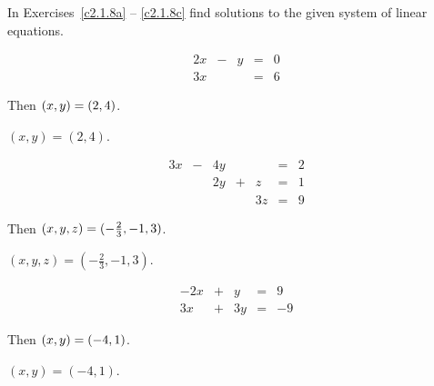 \documentclass{ximera}
\begin{document}
\noindent In Exercises~\ref{c2.1.8a} -- \ref{c2.1.8c} find solutions
to the given system of linear equations.
\begin{exercise} \label{c2.1.8a}
\[
\begin{array}{rcrcr}
 2x & - & y & = & 0 \\
 3x &   &   & = & 6 \end{array}
\]
\begin{prompt}
  Then $(x,y) = ({2},{4})$.
\end{prompt}

\begin{solution}
\ans $(x,y) = (2,4)$.

\end{solution}
\end{exercise}
\begin{exercise} \label{c2.1.8b}
\[
\begin{array}{rcrcrcr}
 3x & - & 4y &   &    & = & 2\\
    &   & 2y & + & z  & = & 1\\
    &   &    &   & 3z & = & 9 \end{array}
\]
\begin{prompt}
  Then  $(x,y,z) = ({-\frac{2}{3}}, {-1}, {3})$.
\end{prompt}

\begin{solution}
\ans $(x,y,z) = (-\frac{2}{3}, -1, 3)$.

\end{solution}
\end{exercise}
\begin{exercise} \label{c2.1.8c}
\[
\begin{array}{rcrcr}
 -2x & + &  y & = &  9 \\
  3x & + & 3y & = & -9 \end{array}
\]
\begin{prompt}
  Then $(x,y) = ({-4},{1})$.
\end{prompt}

\begin{solution}
\ans $(x,y) = (-4,1)$.

\end{solution}
\end{exercise}
\end{document}

